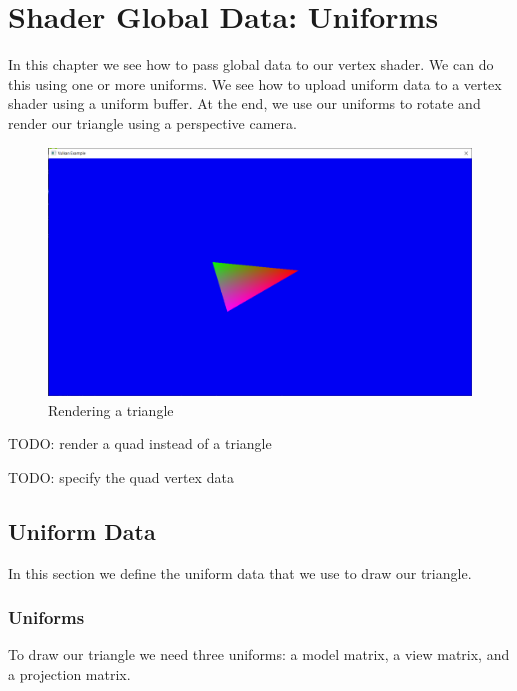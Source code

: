\chapter{Shader Global Data: Uniforms}

In this chapter we see how to pass global data to our vertex shader.
We can do this using one or more uniforms.
We see how to upload uniform data to a vertex shader using a
uniform buffer.
At the end, we use our uniforms to rotate and render our triangle using
a perspective camera.

\begin{figure}[ht]
    \centering
    \includegraphics[scale=0.20]{images/ChUniforms/RenderTriangle.png}
    \caption{Rendering a triangle}
    \label{fig::RenderTriangleUniforms}
\end{figure}

TODO: render a quad instead of a triangle

TODO: specify the quad vertex data

\section{Uniform Data}

In this section we define the uniform data that we use to draw our triangle.

\subsection{Uniforms}

To draw our triangle we need three uniforms:
a model matrix,
a view matrix,
and a projection matrix.

\begin{minipage}{\linewidth}{\noindent}
    
\end{minipage}

